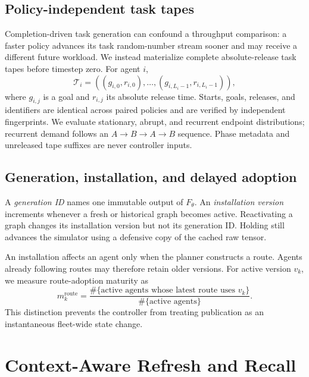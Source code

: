 \documentclass[sigconf,anonymous,review]{acmart}
\begin{document}
\subsection{Policy-independent task tapes}

Completion-driven task generation can confound a throughput comparison: a
faster policy advances its task random-number stream sooner and may receive a
different future workload. We instead materialize complete absolute-release
task tapes before timestep zero. For agent $i$,
\begin{equation}
  \mathcal{T}_i=((g_{i,0},r_{i,0}),\ldots,(g_{i,L_i-1},r_{i,L_i-1})),
\end{equation}
where $g_{i,j}$ is a goal and $r_{i,j}$ its absolute release time. Starts,
goals, releases, and identifiers are identical across paired policies and are
verified by independent fingerprints. We evaluate stationary, abrupt, and
recurrent endpoint distributions; recurrent demand follows an
$A\!\rightarrow\!B\!\rightarrow\!A\!\rightarrow\!B$ sequence. Phase metadata
and unreleased tape suffixes are never controller inputs.

\subsection{Generation, installation, and delayed adoption}

A \emph{generation ID} names one immutable output of $F_\theta$. An
\emph{installation version} increments whenever a fresh or historical graph
becomes active. Reactivating a graph changes its installation version but not
its generation ID. Holding still advances the simulator using a defensive copy
of the cached raw tensor.

An installation affects an agent only when the planner constructs a route.
Agents already following routes may therefore retain older versions. For
active version $v_k$, we measure route-adoption maturity as
\begin{equation}
 m_k^{\mathrm{route}}=
 \frac{\#\{\text{active agents whose latest route uses }v_k\}}
      {\#\{\text{active agents}\}}.
\end{equation}
This distinction prevents the controller from treating publication as an
instantaneous fleet-wide state change.

\section{Context-Aware Refresh and Recall}
\end{document}
